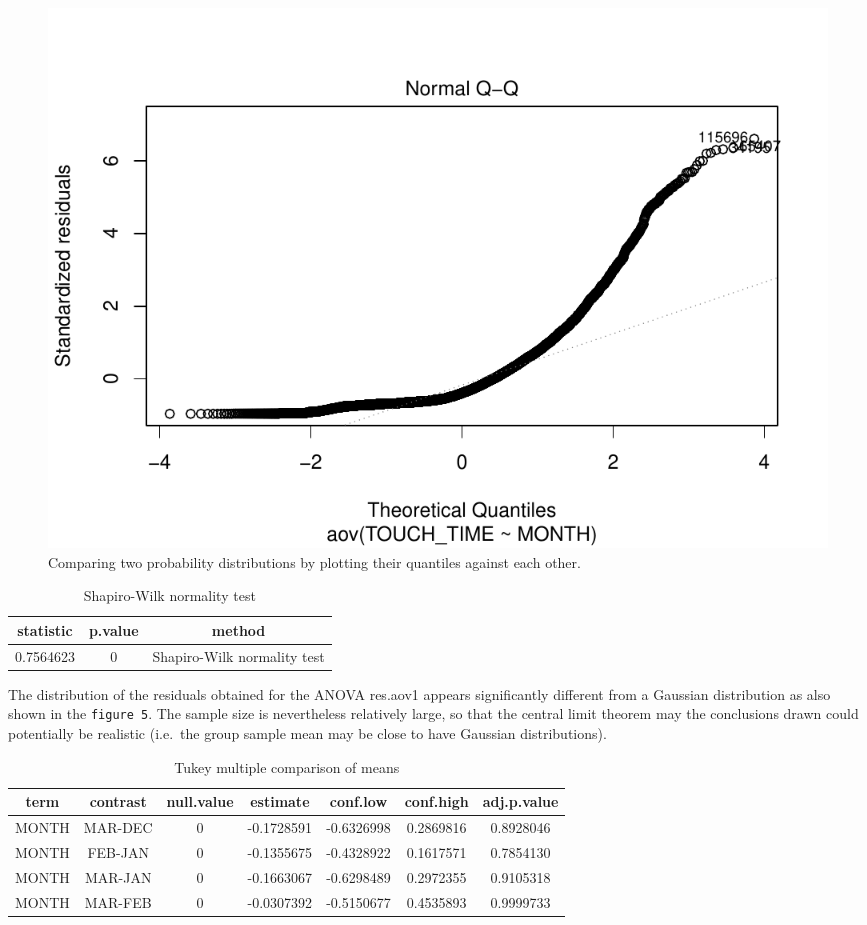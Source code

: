 \documentclass[
  11pt,
]{article}
\begin{document}
\begin{figure}

{\centering \includegraphics{index_files/figure-latex/normalqq-touchtime-month-1} 

}

\caption{Comparing two probability distributions by plotting their quantiles against each other.}\label{fig:normalqq-touchtime-month}
\end{figure}

\begin{table}[H]

\caption{\label{tab:second-test5}Shapiro-Wilk normality test}
\centering
\begin{tabular}[t]{ccc}
\toprule
statistic & p.value & method\\
\midrule
0.7564623 & 0 & Shapiro-Wilk normality test\\
\bottomrule
\end{tabular}
\end{table}

The distribution of the residuals obtained for the ANOVA res.aov1 appears significantly different from a Gaussian distribution as also shown in the \texttt{figure\ 5}. The sample size is nevertheless relatively large, so that the central limit theorem may the conclusions drawn could potentially be realistic (i.e.~the group sample mean may be close to have Gaussian distributions).

\begin{table}[H]

\caption{\label{tab:TukeyHSD-table}Tukey multiple comparison of means}
\centering
\begin{tabular}[t]{ccccccc}
\toprule
term & contrast & null.value & estimate & conf.low & conf.high & adj.p.value\\
\midrule
MONTH & MAR-DEC & 0 & -0.1728591 & -0.6326998 & 0.2869816 & 0.8928046\\
MONTH & FEB-JAN & 0 & -0.1355675 & -0.4328922 & 0.1617571 & 0.7854130\\
MONTH & MAR-JAN & 0 & -0.1663067 & -0.6298489 & 0.2972355 & 0.9105318\\
MONTH & MAR-FEB & 0 & -0.0307392 & -0.5150677 & 0.4535893 & 0.9999733\\
\bottomrule
\end{tabular}
\end{table}
\end{document}
